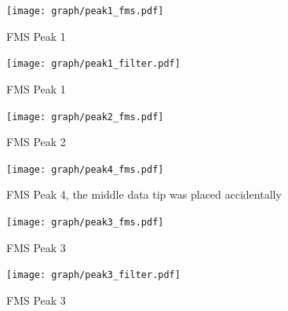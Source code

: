 \begin{figure}[p]
	\centering
	\texttt{[image: graph/peak1\_fms.pdf]}
	\vspace{-2ex}
	\caption{FMS Peak 1}
	\label{fig:P1_fms}
	\vspace{2ex}

	\texttt{[image: graph/peak1\_filter.pdf]}
	\vspace{-2ex}
	\caption{FMS Peak 1}
	\label{fig:P1_filter}
	\vspace{-2em}
\end{figure}

\begin{figure}[p]
	\centering
	\texttt{[image: graph/peak2\_fms.pdf]}
	\vspace{-2ex}
	\caption{FMS Peak 2}
	\label{fig:P2_fms}
	\vspace{2ex}

	\texttt{[image: graph/peak4\_fms.pdf]}
	\vspace{-2ex}
	\caption{FMS Peak 4, the middle data tip was placed accidentally}
	\label{fig:P4_fms}
	\vspace{-2em}
\end{figure}

\begin{figure}[p]
	\centering
	\texttt{[image: graph/peak3\_fms.pdf]}
	\vspace{-2ex}
	\caption{FMS Peak 3}
	\label{fig:P3_fms}
	\vspace{2ex}

	\texttt{[image: graph/peak3\_filter.pdf]}
	\vspace{-2ex}
	\caption{FMS Peak 3}
	\label{fig:P3_filter}
	\vspace{-2em}
\end{figure}
